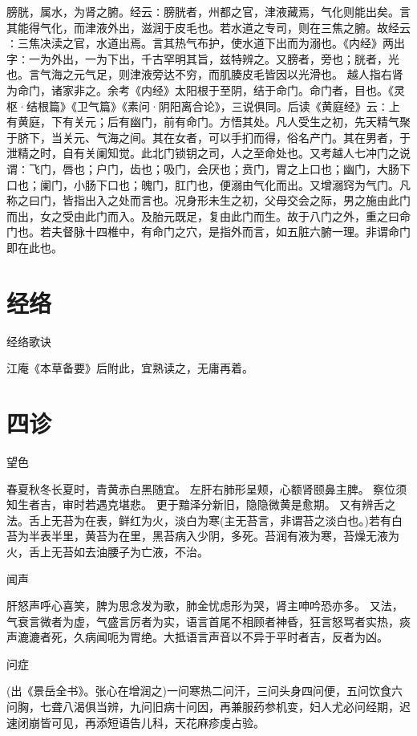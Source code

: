 \documentclass[a4paper,12pt,UTF8,twoside]{ctexbook}
\begin{document}
	膀胱，属水，为肾之腑。经云∶膀胱者，州都之官，津液藏焉，气化则能出矣。言其能得气化，而津液外出，滋润于皮毛也。若水道之专司，则在三焦之腑。故经云∶三焦决渎之官，水道出焉。言其热气布护，使水道下出而为溺也。《内经》两出字∶一为外出，一为下出，千古罕明其旨，兹特辨之。又膀者，旁也；胱者，光也。言气海之元气足，则津液旁达不穷，而肌腠皮毛皆因以光滑也。
	越人指右肾为命门，诸家非之。余考《内经》太阳根于至阴，结于命门。命门者，目也。《灵枢·结根篇》《卫气篇》《素问·阴阳离合论》，三说俱同。后读《黄庭经》云∶上有黄庭，下有关元；后有幽门，前有命门。方悟其处。凡人受生之初，先天精气聚于脐下，当关元、气海之间。其在女者，可以手扪而得，俗名产门。其在男者，于泄精之时，自有关阑知觉。此北门锁钥之司，人之至命处也。又考越人七冲门之说谓∶飞门，唇也；户门，齿也；吸门，会厌也；贲门，胃之上口也；幽门，大肠下口也；阑门，小肠下口也；魄门，肛门也，便溺由气化而出。又增溺窍为气门。凡称之曰门，皆指出入之处而言也。况身形未生之初，父母交会之际，男之施由此门而出，女之受由此门而入。及胎元既足，复由此门而生。故于八门之外，重之曰命门也。若夫督脉十四椎中，有命门之穴，是指外而言，如五脏六腑一理。非谓命门即在此也。
	
	\chapter{经络}
  经络歌诀

	江庵《本草备要》后附此，宜熟读之，无庸再着。
	
	\chapter{四诊}
	望色

	春夏秋冬长夏时，青黄赤白黑随宜。
	左肝右肺形呈颊，心额肾颐鼻主脾。
	察位须知生者吉，审时若遇克堪悲。
	更于黯泽分新旧，隐隐微黄是愈期。
	又有辨舌之法。舌上无苔为在表，鲜红为火，淡白为寒(主无苔言，非谓苔之淡白也。)若有白苔为半表半里，黄苔为在里，黑苔病入少阴，多死。苔润有液为寒，苔燥无液为火，舌上无苔如去油腰子为亡液，不治。

	闻声
  
	肝怒声呼心喜笑，脾为思念发为歌，肺金忧虑形为哭，肾主呻吟恐亦多。
	又法，气衰言微者为虚，气盛言厉者为实，语言首尾不相顾者神昏，狂言怒骂者实热，痰声漉漉者死，久病闻呃为胃绝。大抵语言声音以不异于平时者吉，反者为凶。
		
	问症

	(出《景岳全书》。张心在增润之)一问寒热二问汗，三问头身四问便，五问饮食六问胸，七聋八渴俱当辨，九问旧病十问因，再兼服药参机变，妇人尤必问经期，迟速闭崩皆可见，再添短语告儿科，天花麻疹虔占验。
		
\end{document}
